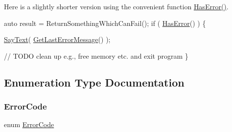 Here is a slightly shorter version using the convenient function {\ttfamily \hyperlink{group__error__group_ga9f6d63ccb598465866b249cbd6dd06c7}{Has\+Error()}}. 
\begin{DoxyCode}
\textcolor{keyword}{auto} result = ReturnSomethingWhichCanFail();
\textcolor{keywordflow}{if} ( \hyperlink{group__error__group_ga9f6d63ccb598465866b249cbd6dd06c7}{HasError}() ) \{

  \hyperlink{group__io__group_ga82cdf45375c3b92b2a60c3d9b55d682f}{SayText}( \hyperlink{group__error__group_gac9be83c8ac2a5d80a2be46487c596eab}{GetLastErrorMessage}() );

  \textcolor{comment}{// TODO clean up e.g., free memory etc. and exit program}
\}
\end{DoxyCode}
 

\subsection{Enumeration Type Documentation}
\mbox{\label{group__error__group_ga59e56af19e754a6aa26a612ebf91d05f}} 
\subsubsection{\texorpdfstring{Error\+Code}{ErrorCode}}
{\footnotesize\ttfamily enum \hyperlink{group__error__group_ga59e56af19e754a6aa26a612ebf91d05f}{Error\+Code}}

